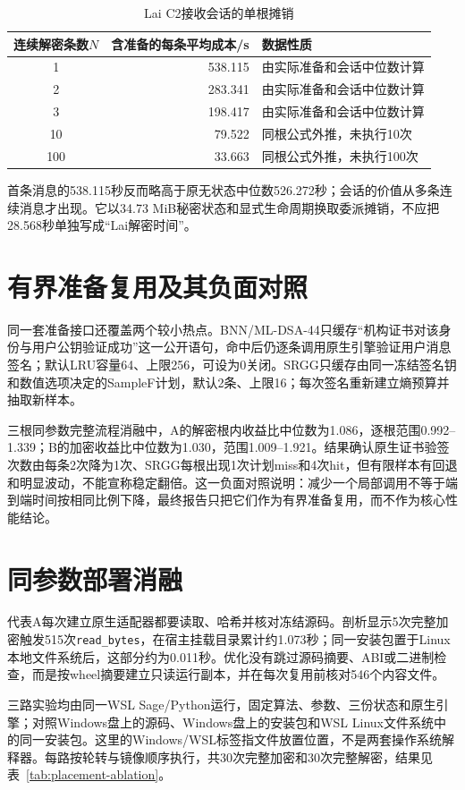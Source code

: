 \documentclass[UTF8,a4paper,12pt,oneside,openany,fontset=fandol]{ctexrep}
\begin{document}
\begin{table}[htbp]
\centering
\small
\caption{Lai C2接收会话的单根摊销}
\label{tab:lai-amortization}
\begin{tabular}{@{}crl@{}}
\toprule
\rowcolor{black!8} 连续解密条数$N$ & 含准备的每条平均成本/s & 数据性质 \\
\midrule
1 & 538.115 & 由实际准备和会话中位数计算 \\
2 & 283.341 & 由实际准备和会话中位数计算 \\
3 & 198.417 & 由实际准备和会话中位数计算 \\
10 & 79.522 & 同根公式外推，未执行10次 \\
100 & 33.663 & 同根公式外推，未执行100次 \\
\bottomrule
\end{tabular}
\end{table}

首条消息的538.115秒反而略高于原无状态中位数526.272秒；会话的价值从多条连续消息才出现。它以34.73 MiB秘密状态和显式生命周期换取委派摊销，不应把28.568秒单独写成“Lai解密时间”。

\section{有界准备复用及其负面对照}
同一套准备接口还覆盖两个较小热点。BNN/ML-DSA-44只缓存“机构证书对该身份与用户公钥验证成功”这一公开语句，命中后仍逐条调用原生引擎验证用户消息签名；默认LRU容量64、上限256，可设为0关闭。SRGG只缓存由同一冻结签名钥和数值选项决定的SampleF计划，默认2条、上限16；每次签名重新建立熵预算并抽取新样本。

三根同参数完整流程消融中，A的解密根内收益比中位数为1.086，逐根范围0.992--1.339；B的加密收益比中位数为1.030，范围1.009--1.921。结果确认原生证书验签次数由每条2次降为1次、SRGG每根出现1次计划miss和4次hit，但有限样本有回退和明显波动，不能宣称稳定翻倍。这一负面对照说明：减少一个局部调用不等于端到端时间按相同比例下降，最终报告只把它们作为有界准备复用，而不作为核心性能结论。

\section{同参数部署消融}
代表A每次建立原生适配器都要读取、哈希并核对冻结源码。剖析显示5次完整加密触发515次\texttt{read\_bytes}，在宿主挂载目录累计约1.073秒；同一安装包置于Linux本地文件系统后，这部分约为0.011秒。优化没有跳过源码摘要、ABI或二进制检查，而是按wheel摘要建立只读运行副本，并在每次复用前核对546个内容文件。

三路实验均由同一WSL Sage/Python运行，固定算法、参数、三份状态和原生引擎；对照Windows盘上的源码、Windows盘上的安装包和WSL Linux文件系统中的同一安装包。这里的Windows/WSL标签指文件放置位置，不是两套操作系统解释器。每路按轮转与镜像顺序执行，共30次完整加密和30次完整解密，结果见表~\ref{tab:placement-ablation}。
\end{document}
